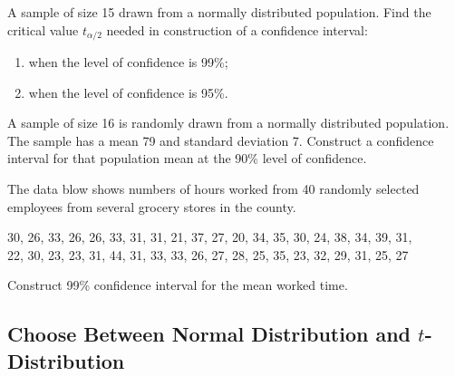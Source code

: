 \begin{example}

A sample of size 15 drawn from a normally distributed population. Find
the critical value \(t_{\alpha/2}\) needed in construction of a
confidence interval:

\begin{enumerate}
\item
  when the level of confidence is 99\%;
\item
  when the level of confidence is 95\%.
\end{enumerate}

\end{example}
\vspace*{3\baselineskip}

\begin{example}

A sample of size 16 is randomly drawn from a normally distributed
population. The sample has a mean 79 and standard deviation 7. Construct
a confidence interval for that population mean at the 90\% level of
confidence.

\end{example}
\vspace*{7\baselineskip}

\begin{example}

The data blow shows numbers of hours worked from 40 randomly selected
employees from several grocery stores in the county.

30, 26, 33, 26, 26, 33, 31, 31, 21, 37, 27, 20, 34, 35, 30, 24, 38, 34, 39, 31,\\
22, 30, 23, 23, 31, 44, 31, 33, 33, 26, 27, 28, 25, 35, 23, 32, 29, 31, 25, 27

Construct 99\% confidence interval for the mean worked time.

\end{example}
\vspace*{8\baselineskip}

\hypertarget{choose-between-normal-distribution-and-t-distribution}{%
\subsection{\texorpdfstring{Choose Between Normal Distribution and
\(t\)-Distribution}{Choose Between Normal Distribution and t-Distribution}}\label{choose-between-normal-distribution-and-t-distribution}}

